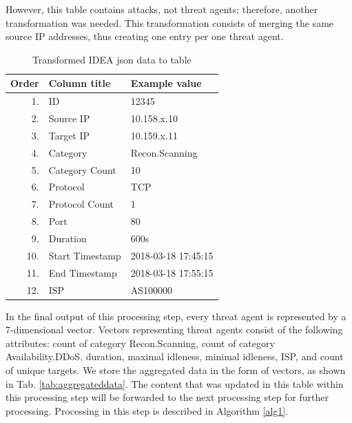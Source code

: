 \documentclass[conference, a4paper]{IEEEtran}
\begin{document}
However, this table contains attacks, not threat agents; therefore, another transformation was needed. This transformation consists of merging the same source IP addresses, thus creating one entry per one threat agent. 

\begin{table}[ht]
\caption{Transformed IDEA json data to table}
\label{tab:ideatrans}
\centering
\begin{tabular}{|r|l||l|}
\hline
\textbf{Order} & \textbf{Column title} & \textbf{Example value} \\ \hline \hline
1. & ID & 12345 \\ \hline
2. & Source IP & 10.158.x.10 \\ \hline
3. & Target IP & 10.159.x.11 \\ \hline
4. & Category & Recon.Scanning \\ \hline
5. & Category Count & 10 \\ \hline
6. & Protocol & TCP \\ \hline
7. & Protocol Count & 1 \\ \hline
8. & Port & 80 \\ \hline
9. & Duration & 600s \\ \hline
10. & Start Timestamp & 2018-03-18 17:45:15 \\ \hline
11. & End Timestamp & 2018-03-18 17:55:15 \\ \hline
12. & ISP & AS100000 \\ \hline
\end{tabular}
\end{table}

In the final output of this processing step, every threat agent is represented by a 7-dimensional vector. Vectors representing threat agents consist of the following attributes: count of category Recon.Scanning, count of category Availability.DDoS, duration, maximal idleness, minimal idleness, ISP, and count of unique targets. We store the aggregated data in the form of vectors, as shown in Tab. \ref{tab:aggregateddata}. The content that was updated in this table within this processing step will be forwarded to the next processing step for further processing. Processing in this step is described in Algorithm \ref{alg1}. 
\end{document}
